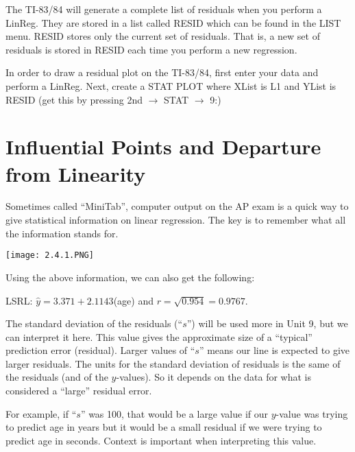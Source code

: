 \documentclass[../stats.tex]{subfiles}
\begin{document}
The TI-83/84 will generate a complete list of residuals when you perform a LinReg. They are stored in a list called RESID which can be found in the LIST menu. RESID stores only the current set 
of residuals. That is, a new set of residuals is stored in RESID each time you perform a new regression.

In order to draw a residual plot on the TI-83/84, first enter your data and perform a LinReg. Next, create a STAT PLOT where XList is L1 and YList is RESID (get this by pressing 2nd $\rightarrow$ STAT $\rightarrow$ 9:)
\section{Influential Points and Departure from Linearity}
Sometimes called ``MiniTab'', computer output on the AP exam is a quick way to give statistical information on linear regression. The key is to remember what all the information stands for.
\begin{center}
    \texttt{[image: 2.4.1.PNG]}
\end{center}
Using the above information, we can also get the following:

LSRL: $\hat{y}=3.371+2.1143$(age) and $r=\sqrt{0.954}=0.9767$.

The standard deviation of the residuals (``$s$'') will be used more in Unit 9, but we can interpret it here. This value gives the approximate size of a ``typical'' prediction error (residual). Larger values of 
``$s$'' means our line is expected to give larger residuals. The units for the standard deviation of residuals is the same of the residuals (and of the $y$-values). So it depends on the data for what is considered a ``large'' residual error.

For example, if ``$s$'' was 100, that would be a large value if our $y$-value was trying to predict age in years but it would be a small residual if we were trying to predict age in seconds. Context is important when interpreting this value.
\end{document}
